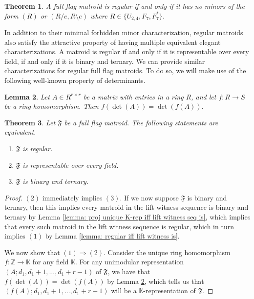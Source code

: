 \documentclass[12pt]{article}
\newtheorem{thm}{Theorem}[section]
\newtheorem{lemma}[thm]{Lemma}
\theoremstyle{definition}
\begin{document}
\begin{thm}\label{thm: regular flag matroids forbidden minors}
    A full flag matroid is regular if and only if it has no minors of the form $(R)$ or $(R/e, R\setminus e)$ where $R \in \{U_{2, 4}, F_7, F_7^*\}$.
\end{thm}

In addition to their minimal forbidden minor characterization, regular matroids also satisfy the attractive property of having multiple equivalent elegant characterizations. A matroid is regular if and only if it is representable over every field\cite[Theorem 6.6.3]{oxley}, if and only if it is binary and ternary\cite[Theorem 10.1.2]{oxley}. We can provide similar characterizations for regular full flag matroids. To do so, we will make use of the following well-known property of determinants.

\begin{lemma}\label{lemma: det commutes}
    Let $A \in R^{r\times r}$ be a matrix with entries in a ring $R$, and let $f : R\to S$ be a ring homomorphism. Then $f(\det(A)) = \det(f(A))$.
\end{lemma}

\begin{thm}\label{thm: regular flag matroids equivalences}
    Let $\mathfrak{F}$ be a full flag matroid. The following statements are equivalent. 
    \begin{enumerate}
        \item $\mathfrak{F}$ is regular.
        \item $\mathfrak{F}$ is representable over every field.
        \item $\mathfrak{F}$ is binary and ternary.
    \end{enumerate}
\end{thm}
\begin{proof}
    $(2)$ immediately implies $(3)$. If we now suppose $\mathfrak{F}$ is binary and ternary, then this implies every matroid in the lift witness sequence is binary and ternary by Lemma \ref{lemma: proj unique K-rep iff lift witness seq is}, which implies that every such matroid in the lift witness sequence is regular, which in turn implies $(1)$ by Lemma \ref{lemma: regular iff lift witness is}. 

    We now show that $(1)\Rightarrow (2)$. Consider the unique ring homomorphism $f : \mathbb{Z} \to \mathbb{K}$ for any field $\mathbb{K}$. For any unimodular representation $(A; d_1, d_1+1, \dots, d_1+r-1)$ of $\mathfrak{F}$, we have that $f(\det(A)) = \det(f(A))$ by Lemma \ref{lemma: det commutes}, which tells us that $(f(A); d_1, d_1+1, \dots, d_1+r-1)$ will be a $\mathbb{K}$-representation of $\mathfrak{F}$.
\end{proof}
\end{document}

